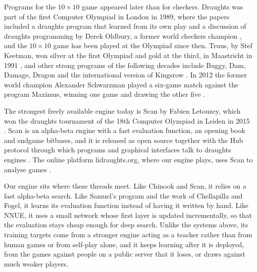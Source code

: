 Programs for the $10\times10$ game appeared later than for checkers. Draughts
was part of the first Computer Olympiad in London in 1989, where the papers
included a draughts program that learned from its own play
\parencite{smeets1989} and a discussion of draughts programming by Derek
Oldbury, a former world checkers champion \parencite{oldbury1989}, and the
$10\times10$ game has been played at the Olympiad since then. Truus, by Stef Keetman, won silver at the first Olympiad and gold at the
third, in Maastricht in 1991 \parencite{cpw_keetman}, and other strong programs
of the following decades include Buggy, Dam, Damage, Dragon and the
international version of Kingsrow \parencite{cpw_draughts}. In 2012 the former
world champion Alexander Schwarzman played a six-game match against the program
Maximus, winning one game and drawing the other five \parencite{vanhorssen2012}.

The strongest freely available engine today is Scan by Fabien Letouzey, which won
the draughts tournament of the 18th Computer Olympiad in Leiden in 2015
\parencite{cpw_draughts}. Scan is an alpha-beta engine with a fast evaluation
function, an opening book and endgame bitbases, and it is released as open
source together with the Hub protocol through which programs and graphical
interfaces talk to draughts engines \parencite{letouzey_scan}. The online platform
lidraughts.org, where our engine plays, uses Scan to analyse games
\parencite{lidraughts}.

Our engine sits where these threads meet. Like Chinook and Scan, it relies on a
fast alpha-beta search. Like Samuel's program and the work of Chellapilla and
Fogel, it learns its evaluation function instead of having it written by hand.
Like NNUE, it uses a small network whose first layer is updated incrementally, so
that the evaluation stays cheap enough for deep search. Unlike the systems above,
its training targets come from a stronger engine acting as a teacher rather than
from human games or from self-play alone, and it keeps learning after it is
deployed, from the games against people on a public server that it loses, or
draws against much weaker players.
